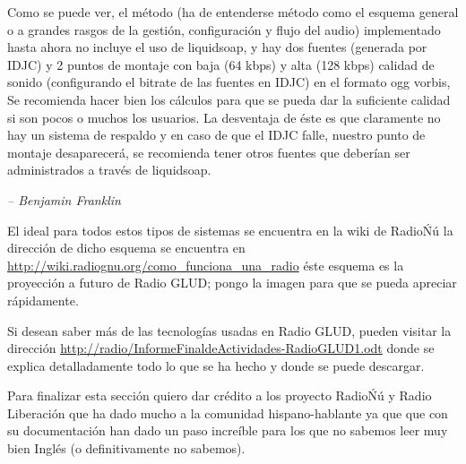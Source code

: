 \begin{multicols}{2}



Como se puede ver, el método (ha de entenderse método como el esquema general o a grandes rasgos de la gestión, configuración y flujo del audio) implementado hasta ahora no incluye el uso de liquidsoap, y hay dos fuentes (generada por IDJC) y 2 puntos de montaje con baja (64 kbps) y alta (128 kbps) calidad de sonido (configurando el bitrate de las fuentes en IDJC) en el formato ogg vorbis, Se recomienda hacer bien los cálculos para que se pueda dar la suficiente calidad si son pocos o muchos los usuarios.\cite{ref5} La desventaja de éste es que claramente no hay un sistema de respaldo y en caso de que el IDJC falle, nuestro punto de montaje desaparecerá, se recomienda tener otros fuentes que deberían ser administrados a través de liquidsoap.

\begin{entradilla} %
{\em {\color{introcolor}{``Aquel que sacrifica la libertad por seguridad, no merece ninguna de las dos''}} -- Benjamin Franklin}
\end{entradilla}

El ideal para todos estos tipos de sistemas se encuentra en la wiki de RadioŃú la dirección de dicho esquema se encuentra en \url{http://wiki.radiognu.org/como_funciona_una_radio} éste esquema es la proyección a futuro de Radio GLUD; pongo la imagen para que se pueda apreciar rápidamente.

\begin{center}
\end{center}

Si desean saber más de las tecnologías usadas en Radio GLUD, pueden visitar la dirección \url{http://radio/InformeFinaldeActividades-RadioGLUD1.odt} donde se explica detalladamente todo lo que se ha hecho y donde se puede descargar.

Para finalizar esta sección quiero dar crédito a los proyecto RadioŃú y Radio Liberación que ha dado mucho a la comunidad hispano-hablante ya que que con su documentación han dado un paso increíble para los que no sabemos leer muy bien Inglés (o definitivamente no sabemos).



\end{multicols}
